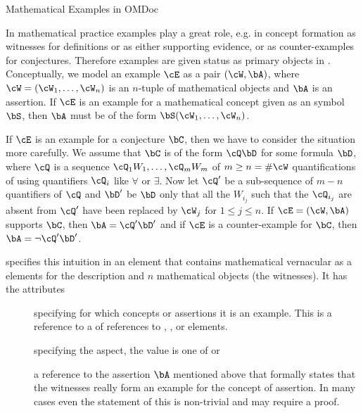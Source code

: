 \begin{omgroup}[short=Mathematical Statements,id=statements]
\begin{omgroup}[id=examples]{Mathematical Examples in OMDoc}
\begin{module}[id=examples]

In mathematical practice examples play a great role, e.g. in concept formation as
witnesses for definitions or as either supporting evidence, or as counter-examples for
conjectures.  Therefore examples are given status as primary objects in \omdoc.
Conceptually, we model an example $\cE$ as a pair $(\cW,\bA)$, where
$\cW=(\cW_1,\ldots,\cW_n)$ is an $n$-tuple of mathematical objects and $\bA$ is an
assertion. If $\cE$ is an example for a mathematical concept given as an \omdoc symbol
$\bS$, then $\bA$ must be of the form $\bS(\cW_1,\ldots,\cW_n)$.
  
If $\cE$ is an example for a conjecture $\bC$, then we have to consider the situation more
carefully. We assume that $\bC$ is of the form $\cQ\bD$ for some formula $\bD$, where
$\cQ$ is a sequence $\cQ_1W_1,\ldots,\cQ_mW_m$ of $m\geq n=\#\cW$ quantifications of using
quantifiers $\cQ_i$ like $\forall$ or $\exists$.  Now let $\cQ'$ be a sub-sequence of
$m-n$ quantifiers of $\cQ$ and $\bD'$ be $\bD$ only that all the $W_{i_j}$ such that the
$\cQ_{i_j}$ are absent from $\cQ'$ have been replaced by $\cW_j$ for $1\leq j\leq n$.  If
$\cE=(\cW,\bA)$ supports $\bC$, then $\bA=\cQ'\bD'$ and if $\cE$ is a counter-example for
$\bC$, then $\bA=\neg\cQ'\bD'$.
  
\begin{definition}[id=example.def]
  \omdoc specifies this intuition in an {} element that contains
  mathematical vernacular as a  elements for the description and
  $n$ mathematical objects (the witnesses). It has the attributes
\begin{description}
\item[] specifying for which concepts or assertions
    it is an example.  This is a reference to a {} of {} references to ,
    , or  elements.
\item[] specifying the aspect, the value is one of
   or 
\item[] a reference to the assertion $\bA$
  mentioned above that formally states that the witnesses really form an example for the
  concept of assertion. In many cases even the statement of this is non-trivial
  and may require a proof.
\end{description}
\end{definition}


\end{module}
\end{omgroup}
\end{omgroup}
